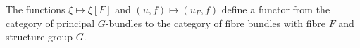 The functions $\xi \mapsto \xi[F]$ and $(u, f) \mapsto (u_F, f)$ define a functor from the category of principal $G$-bundles to the category of fibre bundles with fibre $F$ and structure group $G$.
